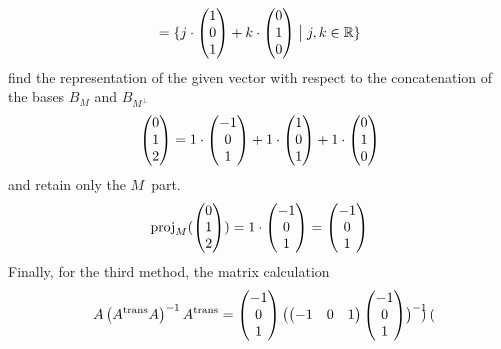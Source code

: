\begin{exercises}
\begin{answer}
\begin{exparts}
\begin{equation*}
             =\set{j\cdot\colvec{1 \\ 0 \\ 1}
                   +k\cdot\colvec{0 \\ 1 \\ 0}\suchthat j,k\in\Re}
           \end{equation*}
           find the representation of the given vector with respect to the
           concatenation of the bases $B_M$ and $B_{M^\perp}$
           \begin{equation*}
             \colvec{0 \\ 1 \\ 2}
              =1\cdot\colvec{-1 \\ 0 \\ 1}
               +1\cdot\colvec{1 \\ 0 \\ 1}
               +1\cdot\colvec{0 \\ 1 \\ 0}
           \end{equation*}
           and retain only the $M$~part.
           \begin{equation*}
             \proj{\colvec{0 \\ 1 \\ 2}}{M}=1\cdot\colvec{-1 \\ 0 \\ 1}
                       =\colvec{-1 \\ 0 \\ 1}
           \end{equation*}
           Finally, for the third method, the matrix calculation
           \begin{multline*}
             A\left(\trans{A}A\right)^{-1}\trans{A}
             =
             \begin{pmatrix}
               -1 \\ 0  \\  1
             \end{pmatrix}
             \bigl(
               \begin{pmatrix}
                 -1  &0  &1
               \end{pmatrix}
               \begin{pmatrix}
                 -1  \\
                  0  \\
                  1
               \end{pmatrix}
             \bigr)^{-1}
             \begin{pmatrix}

\end{pmatrix}
\end{multline*}
\end{exparts}
\end{answer}
\end{exercises}

